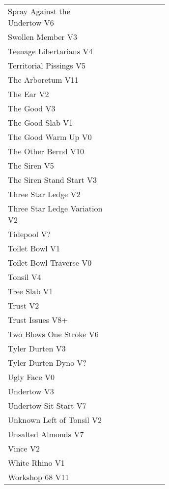 \begin{multicols*}{2}
\begin{center}
\begin{supertabular}{p{0.65\linewidth}r}
Spray Against the Undertow V6 & \pageref{vr:Spray Against the Undertow} \\
Swollen Member V3 & \pageref{rt:Swollen Member} \\
Teenage Libertarians V4 & \pageref{rt:Teenage Libertarians} \\
Territorial Pissings V5 & \pageref{rt:Territorial Pissings} \\
The Arboretum V11 & \pageref{rt:The Arboretum} \\
The Ear V2 & \pageref{rt:The Ear} \\
The Good V3 & \pageref{rt:The Good} \\
The Good Slab V1 & \pageref{rt:The Good Slab} \\
The Good Warm Up V0 & \pageref{rt:The Good Warm Up} \\
The Other Bernd V10 & \pageref{rt:The Other Bernd} \\
The Siren V5 & \pageref{rt:The Siren} \\
The Siren Stand Start V3 & \pageref{vr:The Siren Stand Start} \\
Three Star Ledge V2 & \pageref{rt:Three Star Ledge} \\
Three Star Ledge Variation V2 & \pageref{vr:Three Star Ledge Variation} \\
Tidepool V? & \pageref{rt:Tidepool} \\
Toilet Bowl V1 & \pageref{rt:Toilet Bowl} \\
Toilet Bowl Traverse V0 & \pageref{rt:Toilet Bowl Traverse} \\
Tonsil V4 & \pageref{rt:Tonsil} \\
Tree Slab V1 & \pageref{rt:Tree Slab} \\
Trust V2 & \pageref{rt:Trust} \\
Trust Issues V8+ & \pageref{rt:Trust Issues} \\
Two Blows One Stroke V6 & \pageref{rt:Two Blows One Stroke} \\
Tyler Durten V3 & \pageref{rt:Tyler Durten} \\
Tyler Durten Dyno V? & \pageref{vr:Tyler Durten Dyno} \\
Ugly Face V0 & \pageref{rt:Ugly Face} \\
Undertow V3 & \pageref{rt:Undertow} \\
Undertow Sit Start V7 & \pageref{vr:Undertow Sit Start} \\
Unknown Left of Tonsil V2 & \pageref{rt:Unknown Left of Tonsil} \\
Unsalted Almonds V7 & \pageref{rt:Unsalted Almonds} \\
Vince V2 & \pageref{rt:Vince} \\
White Rhino V1 & \pageref{rt:White Rhino} \\
Workshop 68 V11 & \pageref{rt:Workshop 68} \\
\end{supertabular}
\end{center}

\end{multicols*}
